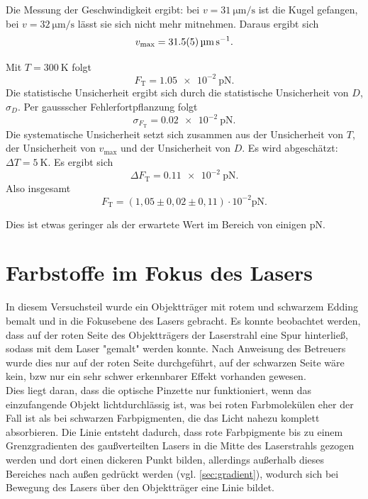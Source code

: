 Die Messung der Geschwindigkeit ergibt: bei $v=\SI{31}{\micro\meter\per\second}$ ist die Kugel gefangen, bei $v=\SI{32}{\micro\meter\per\second}$ lässt sie sich nicht mehr mitnehmen. Daraus ergibt sich
\begin{equation}
 v_{\textrm{max}} = \SI{31,5\pm0,5}{\micro\meter\per\second}.
\end{equation}

Mit $T=\SI{300}{\kelvin}$ folgt
\begin{equation}
 F_{\textrm{T}} =  \SI{1,05e-2}{\pico\newton}.
\end{equation}
Die statistische Unsicherheit ergibt sich durch die statistische Unsicherheit von $D$, $\sigma_{D}$. Per gaussscher Fehlerfortpflanzung folgt
\begin{equation}
 \sigma_{F_{\textrm{T}}} = \SI{0,02e-2}{\pico\newton}.
\end{equation}
Die systematische Unsicherheit setzt sich zusammen aus der Unsicherheit von $T$, der Unsicherheit von $v_{\textrm{max}}$ und der Unsicherheit von $D$. Es wird abgeschätzt: $\Delta T = \SI{5}{\kelvin}$.
Es ergibt sich
\begin{equation}
 \Delta F_{\textrm{T}} = \SI{0,11e-2}{\pico\newton}.
\end{equation}
Also insgesamt
\begin{equation}
 F_{\textrm{T}} = (1,05\pm0,02\pm0,11)\cdot 10^{-2} \si{\pico\newton}.
\end{equation}

Dies ist etwas geringer als der erwartete Wert im Bereich von einigen $\si{\pico\newton}$.

\section{Farbstoffe im Fokus des Lasers}

In diesem Versuchsteil wurde ein Objektträger mit rotem und schwarzem Edding bemalt und in die Fokusebene des Lasers gebracht. 
Es konnte beobachtet werden, dass auf der roten Seite des Objektträgers der Laserstrahl eine Spur hinterließ, sodass mit dem Laser "gemalt" werden konnte. Nach Anweisung des Betreuers wurde dies nur auf der roten Seite durchgeführt, auf der schwarzen Seite wäre kein, bzw nur ein sehr schwer erkennbarer Effekt vorhanden gewesen.\\
Dies liegt daran, dass die optische Pinzette nur funktioniert, wenn das einzufangende Objekt lichtdurchlässig ist, was bei roten Farbmolekülen eher der Fall ist als bei schwarzen Farbpigmenten, die das Licht nahezu komplett absorbieren.
Die Linie entsteht dadurch, dass rote Farbpigmente bis zu einem Grenzgradienten des gaußverteilten Lasers in die Mitte des Laserstrahls gezogen werden und dort einen dickeren Punkt bilden, allerdings außerhalb dieses Bereiches nach außen gedrückt werden (vgl. \ref{sec:gradient}), wodurch sich bei Bewegung des Lasers über den Objektträger eine Linie bildet.